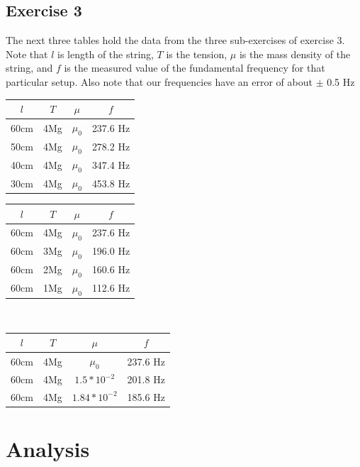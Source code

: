 \documentclass[a4paper,12pt]{article}
\begin{document}
\subsection{Exercise 3}
The next three tables hold the data from the three sub-exercises of
exercise 3. Note that $l$ is length of the string, $T$ is the tension,
$\mu$ is the mass density of the string, and $f$ is the measured value
of the fundamental frequency for that particular setup. Also note that
our frequencies have an error of about $\pm$ 0.5 Hz \\

\begin{tabular}{c | c | c | c}
  $l$ & $T$ & $\mu$ & $f$ \\
  \hline
  60cm & 4Mg & $\mu_0$ & 237.6 Hz \\
  50cm & 4Mg & $\mu_0$ & 278.2 Hz \\
  40cm & 4Mg & $\mu_0$ & 347.4 Hz \\
  30cm & 4Mg & $\mu_0$ & 453.8 Hz \\
\end{tabular}

\vspace{1cm}

\begin{tabular}{c | c | c | c}
  $l$ & $T$ & $\mu$ & $f$ \\
  \hline
  60cm & 4Mg & $\mu_0$ & 237.6 Hz \\
  60cm & 3Mg & $\mu_0$ & 196.0 Hz \\
  60cm & 2Mg & $\mu_0$ & 160.6 Hz \\
  60cm & 1Mg & $\mu_0$ & 112.6 Hz \\
\end{tabular}\\

\vspace{1cm}

\begin{tabular}{c | c | c | c}
  $l$ & $T$ & $\mu$ & $f$ \\
  \hline
  60cm & 4Mg & $\mu_0$ & 237.6 Hz \\
  60cm & 4Mg & $1.5 * 10^{-2}$ & 201.8 Hz \\
  60cm & 4Mg & $1.84 * 10^{-2}$ & 185.6 Hz \\
\end{tabular}

\section{Analysis}
\end{document}
